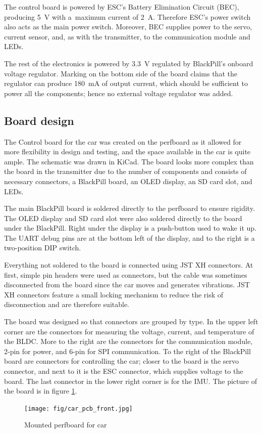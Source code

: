 The control board is powered by ESC's Battery Elimination Circuit (BEC), producing \SI{5}{\V} with a~maximum current of \SI{2}{\A}. Therefore ESC's power switch also acts as the main power switch. Moreover, BEC supplies power to the servo, current sensor, and, as with the transmitter, to the communication module and LEDs.

The rest of the electronics is powered by \SI{3.3}{\V} regulated by BlackPill's onboard voltage regulator. Marking on the bottom side of the board claims that the regulator can produce \SI{180}{\mA} of output current, which should be sufficient to power all the components; hence no external voltage regulator was added.

\subsection{Board design}
The Control board for the car was created on the perfboard as it allowed for more flexibility in design and testing, and the space available in the car is quite ample. The schematic was drawn in KiCad. The board looks more complex than the board in the transmitter due to the number of components and consists of necessary connectors, a BlackPill board, an OLED display, an SD card slot, and LEDs.

The main BlackPill board is soldered directly to the perfboard to ensure rigidity. The OLED display and SD card slot were also soldered directly to the board under the BlackPill. Right under the display is a push-button used to wake it up. The UART debug pins are at the bottom left of the display, and to the right is a two-position DIP switch.

Everything not soldered to the board is connected using JST XH connectors. At first, simple pin headers were used as connectors, but the cable was sometimes disconnected from the board since the car moves and generates vibrations. JST XH connectors feature a small locking mechanism to reduce the risk of disconnection and are therefore suitable.

The board was designed so that connectors are grouped by type. In the upper left corner are the connectors for measuring the voltage, current, and temperature of the BLDC. More to the right are the connectors for the communication module, 2-pin for power, and 6-pin for SPI communication. To the right of the BlackPill board are connectors for controlling the car; closer to the board is the servo connector, and next to it is the ESC connector, which supplies voltage to the board. The last connector in the lower right corner is for the IMU. The picture of the board is in figure \ref{fig:car_pcb}.
\begin{figure}[t]
\centering
\texttt{[image: fig/car\_pcb\_front.jpg]}
\caption{Mounted perfboard for car}
\label{fig:car_pcb}
\end{figure}

